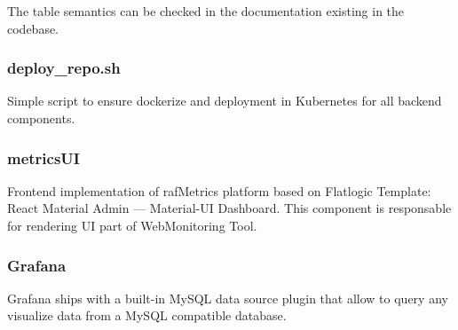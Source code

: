 The table semantics can be checked in the documentation existing in the codebase.

\subsubsection{deploy\_repo.sh}
Simple script to ensure dockerize and deployment in Kubernetes for all backend components.

\subsubsection{metricsUI}
Frontend implementation of rafMetrics platform based on Flatlogic Template: React Material Admin — Material-UI Dashboard. This component is responsable for rendering UI part of WebMonitoring Tool.

\subsubsection{Grafana}
Grafana ships with a built-in MySQL data source plugin that allow to query any visualize data from a MySQL compatible database.
